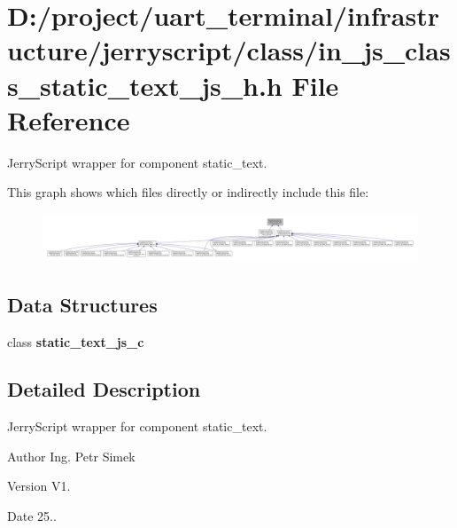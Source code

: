 \section{D\+:/project/uart\+\_\+terminal/infrastructure/jerryscript/class/in\+\_\+js\+\_\+class\+\_\+static\+\_\+text\+\_\+js\+\_\+h.h File Reference}
\label{in__js__class__static__text__js__h_8h}


Jerry\+Script wrapper for component static\+\_\+text.  


This graph shows which files directly or indirectly include this file\+:
\nopagebreak
\begin{figure}[H]
\begin{center}
\leavevmode
\includegraphics[width=350pt]{in__js__class__static__text__js__h_8h__dep__incl}
\end{center}
\end{figure}
\subsection*{Data Structures}
\begin{DoxyCompactItemize}
\item 
class \textbf{ static\+\_\+text\+\_\+js\+\_\+c}
\end{DoxyCompactItemize}


\subsection{Detailed Description}
Jerry\+Script wrapper for component static\+\_\+text. 

\begin{DoxyAuthor}{Author}
Ing. Petr Simek 
\end{DoxyAuthor}
\begin{DoxyVersion}{Version}
V1. 
\end{DoxyVersion}
\begin{DoxyDate}{Date}
25.. 
\end{DoxyDate}
